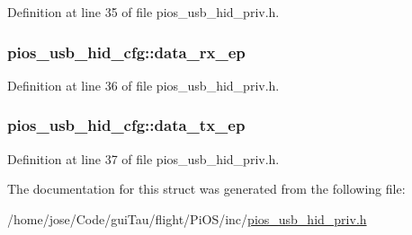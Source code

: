 Definition at line 35 of file pios\-\_\-usb\-\_\-hid\-\_\-priv.\-h.

\hypertarget{structpios__usb__hid__cfg_a9e2b92a09aa1fefba09f5668d00e2ef7}{
\subsubsection[{data\-\_\-rx\-\_\-ep}]{ pios\-\_\-usb\-\_\-hid\-\_\-cfg\-::data\-\_\-rx\-\_\-ep}}\label{structpios__usb__hid__cfg_a9e2b92a09aa1fefba09f5668d00e2ef7}


Definition at line 36 of file pios\-\_\-usb\-\_\-hid\-\_\-priv.\-h.

\hypertarget{structpios__usb__hid__cfg_a700e6e6591adae231e06b05411cb321b}{
\subsubsection[{data\-\_\-tx\-\_\-ep}]{ pios\-\_\-usb\-\_\-hid\-\_\-cfg\-::data\-\_\-tx\-\_\-ep}}\label{structpios__usb__hid__cfg_a700e6e6591adae231e06b05411cb321b}


Definition at line 37 of file pios\-\_\-usb\-\_\-hid\-\_\-priv.\-h.



The documentation for this struct was generated from the following file\-:\begin{DoxyCompactItemize}
\item 
/home/jose/\-Code/gui\-Tau/flight/\-Pi\-O\-S/inc/\hyperlink{pios__usb__hid__priv_8h}{pios\-\_\-usb\-\_\-hid\-\_\-priv.\-h}\end{DoxyCompactItemize}
